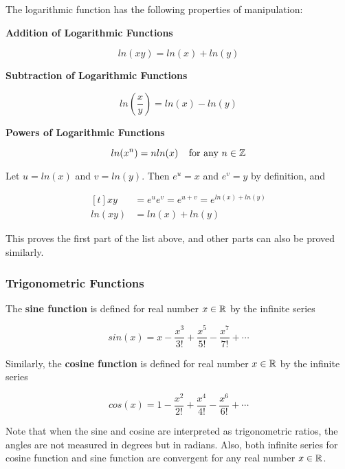 \documentclass[a4paper,12pt]{article}
\begin{document}
\begin{thm}
  The logarithmic function has the following properties of manipulation:

  \begin{alist}
    \item \textbf{Addition of Logarithmic Functions}

    $$ln(xy)=ln(x)+ln(y)$$

    \item \textbf{Subtraction of Logarithmic Functions}

    $$ln\left(\frac{x}{y}\right)=ln(x)-ln(y)$$

    \item \textbf{Powers of Logarithmic Functions}

    $$ln(x^{n})=nln(x)\;\;\;\;\text{for any }n\in \mathbb{Z}$$
  \end{alist}

  \prf Let $u=ln(x)$ and $v=ln(y)$. Then $e^{u}=x$ and $e^{v}=y$ by definition, and

  $$\begin{aligned}[t]
    xy&=e^{u}e^{v}=e^{u+v}=e^{ln(x)+ln(y)}\\
    ln(xy)&=ln(x)+ln(y)
  \end{aligned}$$\s

  This proves the first part of the list above, and other parts can also be proved similarly.
\end{thm}

\subsubsection{Trigonometric Functions}
\begin{dft}
  The \textbf{sine function} is defined for real number $x\in \mathbb{R}$ by the infinite series

  $$sin(x)=x-\frac{x^{3}}{3!}+\frac{x^{5}}{5!}-\frac{x^{7}}{7!}+\cdots$$\s

  Similarly, the \textbf{cosine function} is defined for real number $x\in \mathbb{R}$ by the infinite series

  $$cos(x)=1-\frac{x^{2}}{2!}+\frac{x^{4}}{4!}-\frac{x^{6}}{6!}+\cdots$$
\end{dft}\n

Note that when the sine and cosine are interpreted as trigonometric ratios, the angles are not measured in degrees but in radians. Also, both infinite series for cosine function and sine function are convergent for any real number $x\in \mathbb{R}$.\n
\end{document}
